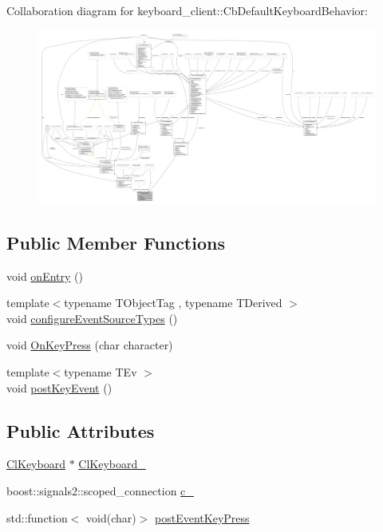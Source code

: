 Collaboration diagram for keyboard\+\_\+client\+:\+:Cb\+Default\+Keyboard\+Behavior\+:
\nopagebreak
\begin{figure}[H]
\begin{center}
\leavevmode
\includegraphics[width=350pt]{classkeyboard__client_1_1CbDefaultKeyboardBehavior__coll__graph}
\end{center}
\end{figure}
\subsection*{Public Member Functions}
\begin{DoxyCompactItemize}
\item 
void \hyperlink{classkeyboard__client_1_1CbDefaultKeyboardBehavior_a1ac673a9d9a733215f665810d6cf69aa}{on\+Entry} ()
\item 
{\footnotesize template$<$typename T\+Object\+Tag , typename T\+Derived $>$ }\\void \hyperlink{classkeyboard__client_1_1CbDefaultKeyboardBehavior_a70465c0886d118d226d136a4acc63ef3}{configure\+Event\+Source\+Types} ()
\item 
void \hyperlink{classkeyboard__client_1_1CbDefaultKeyboardBehavior_ae6b6fa6b648a503f2a55eccde8556daa}{On\+Key\+Press} (char character)
\item 
{\footnotesize template$<$typename T\+Ev $>$ }\\void \hyperlink{classkeyboard__client_1_1CbDefaultKeyboardBehavior_ae02c14e58b7348af59f3f82bfadbbbdd}{post\+Key\+Event} ()
\end{DoxyCompactItemize}
\subsection*{Public Attributes}
\begin{DoxyCompactItemize}
\item 
\hyperlink{classkeyboard__client_1_1ClKeyboard}{Cl\+Keyboard} $\ast$ \hyperlink{classkeyboard__client_1_1CbDefaultKeyboardBehavior_a17c088cabe2d686f227d2a6368629993}{Cl\+Keyboard\+\_\+}
\item 
boost\+::signals2\+::scoped\+\_\+connection \hyperlink{classkeyboard__client_1_1CbDefaultKeyboardBehavior_a4872d81538980d9a706cc271902097f1}{c\+\_\+}
\item 
std\+::function$<$ void(char)$>$ \hyperlink{classkeyboard__client_1_1CbDefaultKeyboardBehavior_ac3a5e8c2cca0fd4117ddc192858d3771}{post\+Event\+Key\+Press}
\end{DoxyCompactItemize}


